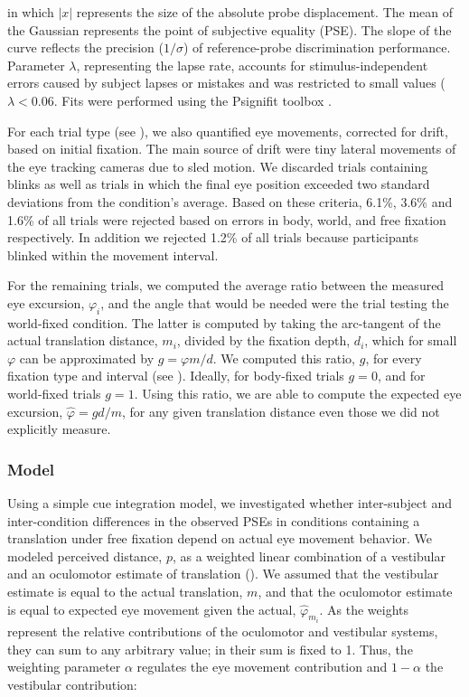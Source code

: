 in which $|x|$ represents the size of the absolute probe displacement. The mean of the Gaussian represents the point of subjective equality (PSE). The slope of the curve reflects the precision ($1/\sigma$) of reference-probe discrimination performance. Parameter $\lambda$, representing the lapse rate, accounts for stimulus-independent errors caused by subject lapses or mistakes and was restricted to small values ($\lambda < 0.06$. Fits were performed using the Psignifit toolbox \cite{wichmann2001,wichmann2001b}.

For each trial type (see ), we also quantified eye movements, corrected for drift, based on initial fixation. The main source of drift were tiny lateral movements of the eye tracking cameras due to sled motion. We discarded trials containing blinks as well as trials in which the final eye position exceeded two standard deviations from the condition's average. Based on these criteria, 6.1\%, 3.6\% and 1.6\% of all trials were rejected based on errors in body, world, and free fixation respectively. In addition we rejected 1.2\% of all trials because participants blinked within the movement interval.

For the remaining trials, we computed the average ratio between the measured eye excursion, $\varphi_i$, and the angle that would be needed were the trial testing the world-fixed condition. The latter is computed by taking the arc-tangent of the actual translation distance, $m_i$, divided by the fixation depth, $d_i$, which for small $\varphi$ can be approximated by $g = \varphi m/d$. We computed this ratio, $g$, for every fixation type and interval (see ). Ideally, for body-fixed trials $g = 0$, and for world-fixed trials $g = 1$. Using this ratio, we are able to compute the expected eye excursion, $\hat{\varphi} = gd/m$, for any given translation distance even those we did not explicitly measure.

\subsubsection{Model}
\label{p3:sec:model}

Using a simple cue integration model, we investigated whether inter-subject and inter-condition differences in the observed PSEs in conditions containing a translation under free fixation depend on actual eye movement behavior. We modeled perceived distance, $p$, as a weighted linear combination of a vestibular and an oculomotor estimate of translation (). We assumed that the vestibular estimate is equal to the actual translation, $m$, and that the oculomotor estimate is equal to expected eye movement given the  actual, $\hat{\varphi}_{m_i}$. As the weights represent the relative contributions of the oculomotor and vestibular systems, they can sum to any arbitrary value; in  their sum is fixed to 1. Thus, the weighting parameter $\alpha$ regulates the eye movement contribution and $1 - \alpha$  the vestibular contribution:

